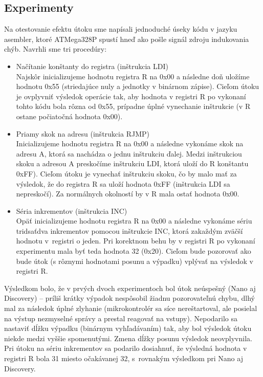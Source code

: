 \subsection{Experimenty} \label{kap3:sek:experimenty}
Na otestovanie efektu útoku sme napísali jednoduché úseky kódu v jazyku asembler, ktoré ATMega328P spustí hneď ako pošle signál zdroju indukovania chýb. Navrhli sme tri procedúry:
\begin{itemize}
    \item Načítanie konštanty do registra (inštrukcia LDI)\\
    Najskôr inicializujeme hodnotu registra R na 0x00 a následne doň uložíme hodnotu 0x55 (striedajúce nuly a jednotky v binárnom zápise). Cieľom útoku je ovplyvniť výsledok operácie tak, aby hodnota v registri R po vykonaní tohto kódu bola rôzna od 0x55, prípadne úplné vynechanie inštrukcie (v R ostane počiatočná hodnota 0x00).
    \item Priamy skok na adresu (inštrukcia RJMP)\\
    Inicializujeme hodnotu registra R na 0x00 a následne vykonáme skok na adresu A, ktorá sa nachádza o jednu inštrukciu ďalej. Medzi inštrukciou skoku a adresou A preskočíme inštrukciu LDI, ktorá uloží do R konštantu 0xFF). Cieľom útoku je vynechať inštrukciu skoku, čo by malo mať za výsledok, že do registra R sa uloží hodnota 0xFF (inštrukcia LDI sa nepreskočí). Za normálnych okolností by v R mala ostať hodnota 0x00.
    \item Séria inkrementov (inštrukcia INC)\\
    Opäť inicializujeme hodnotu registra R na 0x00 a následne vykonáme sériu tridsaťdva inkrementov pomocou inštrukcie INC, ktorá zakaždým zväčší hodnotu v~registri o jeden. Pri korektnom behu by v registri R po vykonaní experimentu mala byť teda hodnota 32 (0x20). Cieľom bude pozorovať ako bude útok (s rôznymi hodnotami posunu a výpadku) vplývať na výsledok v registri R.
\end{itemize}

Výsledkom bolo, že v prvých dvoch experimentoch bol útok neúspešný (Nano aj Discovery) -- príliš krátky výpadok nespôsobil žiadnu pozorovateľnú chybu, dlhý mal za následok úplné zlyhanie (mikrokontrolér sa síce nereštartoval, ale posielal na výstup nezmyselné správy a prestal reagovať na vstupy). Nepodarilo sa nastaviť dĺžku výpadku (binárnym vyhľadávaním) tak, aby bol výsledok útoku niekde medzi vyššie spomenutými. Zmena dĺžky posunu výsledok neovplyvnila. Pri útoku na sériu inkrementov sa podarilo dosiahnuť, že výsledná hodnota v registri R bola 31 miesto očakávanej 32, s~rovnakým výsledkom pri Nano aj Discovery.

